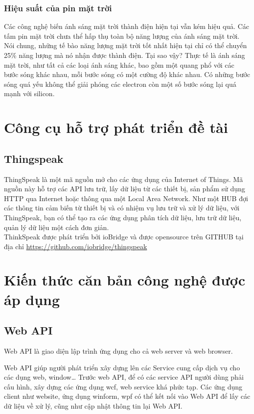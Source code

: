 \subsubsection*{Hiệu suất của pin mặt trời}
Các công nghệ biến ánh sáng mặt trời thành điện hiện tại vẫn kém hiệu quả. Các tấm pin mặt trời chưa thể hấp thụ toàn bộ năng lượng của ánh sáng mặt trời. Nói chung, những tế bào năng lượng mặt trời tốt nhất hiện tại chỉ có thể chuyển 25\% năng lượng mà nó nhận được thành điện. Tại sao vậy? Thực tế là ánh sáng mặt trời, như tất cả các loại ánh sáng khác, bao gồm một quang phổ với các bước sóng khác nhau, mỗi bước sóng có một cường độ khác nhau. Có những bước sóng quá yếu không thể giải phóng các electron còn một số bước sóng lại quá mạnh với silicon.

\section{Công cụ hỗ trợ phát triển đề tài}
\subsection{Thingspeak}
ThingSpeak là một mã nguồn mở cho các ứng dụng của Internet of Things. Mã nguồn này hỗ trợ các API lưu trữ, lấy dữ liệu từ các thiết bị, sản phẩm sử dụng HTTP qua Internet hoặc thông qua một Local Area Network. Như một HUB đợi các thông tin cảm biến từ thiết bị và có nhiệm vụ lưu trữ và xử lý dữ liệu, với ThingSpeak, bạn có thể tạo ra các ứng dụng phân tích dữ liệu, lưu trữ dữ liệu, quản lý dữ liệu một cách đơn giản.\\
ThinkSpeak được phát triển bởi ioBridge và được opensource trên GITHUB tại địa chỉ \url{https://github.com/iobridge/thingspeak}


\section{Kiến thức căn bản công nghệ được áp dụng}

\subsection{Web API} 

Web API là giao diện lập trình ứng dụng cho cả web server và web browser.\cite{c2api}

Web API giúp người phát triển xây dựng lên các Service cung cấp dịch vụ cho các  dụng web, window… Trước web API, để có các service API người dùng phải cấu hình, xây dựng các ứng dụng wcf, web service khá phức tạp. Các ứng dụng client như website, ứng dụng winform, wpf có thể kết nối vào Web API để lấy các dữ liệu về xử lý, cũng như cập nhật thông tin lại Web API.

